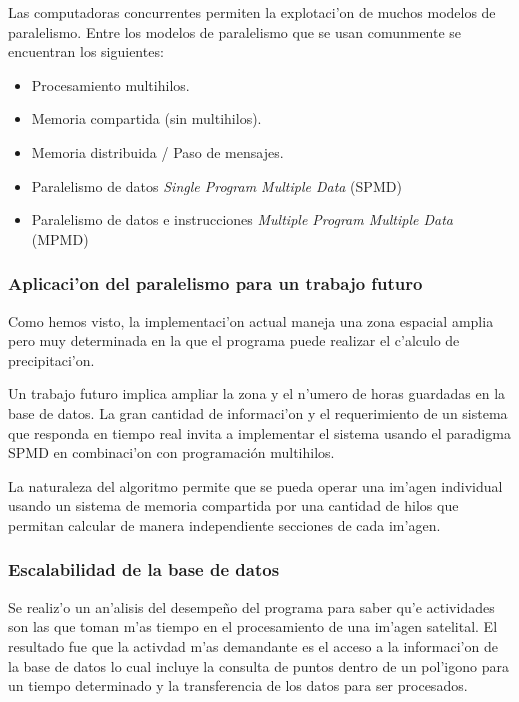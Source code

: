   Las computadoras concurrentes permiten la explotaci'on de muchos modelos de paralelismo. Entre 
  los modelos de paralelismo que se usan comunmente se encuentran los siguientes:

\begin{itemize}
  \item Procesamiento multihilos.
  \item Memoria compartida (sin multihilos).
  \item Memoria distribuida / Paso de mensajes.
  \item Paralelismo de datos \textit{Single Program Multiple Data} (SPMD)
  \item Paralelismo de datos e instrucciones \textit{Multiple Program Multiple Data} (MPMD)
 \end{itemize}

  \subsubsection*{Aplicaci'on del paralelismo para un trabajo futuro}
  
Como hemos visto, la implementaci'on actual maneja una zona espacial amplia pero muy determinada en la que el programa puede realizar 
el c'alculo de precipitaci'on.

Un trabajo futuro implica ampliar la zona y el n'umero de horas guardadas en la base de datos. La gran cantidad de informaci'on
y el requerimiento de un sistema que responda en tiempo real invita a implementar el sistema usando el paradigma SPMD 
en combinaci'on con programación multihilos.

La naturaleza del algoritmo permite que se pueda operar una im'agen individual usando un sistema de memoria compartida por 
una cantidad de hilos que permitan calcular de manera independiente secciones de cada im'agen.
  

\subsubsection*{Escalabilidad de la base de datos}
Se realiz'o un an'alisis del desempe\~no del programa para saber qu'e
actividades son las que toman m'as tiempo en el procesamiento de
una im'agen satelital. El resultado fue que la activdad m'as
demandante es el acceso a la informaci'on de la base de datos lo cual
incluye la consulta de puntos dentro de un pol'igono para un tiempo
determinado y la transferencia de los datos para ser procesados. 

